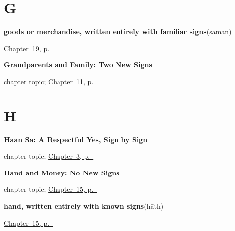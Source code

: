 \section*{G}

\noindent\begin{minipage}[t]{\linewidth}
\raggedright
\textbf{goods or merchandise, written entirely with familiar signs}\enspace\emph{}\enspace(sāmān)\par
\footnotesize \hyperref[ch:mw-shopping-five]{Chapter~19, p.~\pageref*{ch:mw-shopping-five}}
\end{minipage}\par\smallskip

\noindent\begin{minipage}[t]{\linewidth}
\raggedright
\textbf{Grandparents and Family: Two New Signs}\par
\footnotesize chapter topic; \hyperref[ch:mw-family-seven]{Chapter~11, p.~\pageref*{ch:mw-family-seven}}
\end{minipage}\par\smallskip

\section*{H}

\noindent\begin{minipage}[t]{\linewidth}
\raggedright
\textbf{Haan Sa: A Respectful Yes, Sign by Sign}\par
\footnotesize chapter topic; \hyperref[ch:mw-haan-saa]{Chapter~3, p.~\pageref*{ch:mw-haan-saa}}
\end{minipage}\par\smallskip

\noindent\begin{minipage}[t]{\linewidth}
\raggedright
\textbf{Hand and Money: No New Signs}\par
\footnotesize chapter topic; \hyperref[ch:mw-travel-five]{Chapter~15, p.~\pageref*{ch:mw-travel-five}}
\end{minipage}\par\smallskip

\noindent\begin{minipage}[t]{\linewidth}
\raggedright
\textbf{hand, written entirely with known signs}\enspace\emph{}\enspace(hāth)\par
\footnotesize \hyperref[ch:mw-travel-five]{Chapter~15, p.~\pageref*{ch:mw-travel-five}}
\end{minipage}\par\smallskip

